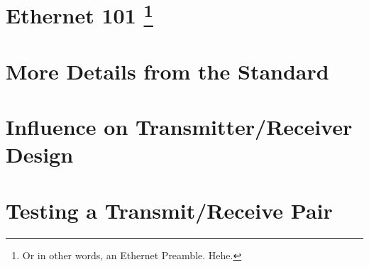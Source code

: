 \documentclass{article}
\begin{document}
\section*{Ethernet 101 \footnote{Or in other words, an Ethernet Preamble. Hehe.}}

\section*{More Details from the Standard}



\section*{Influence on Transmitter/Receiver Design}

\section*{Testing a Transmit/Receive Pair}
\end{document}
